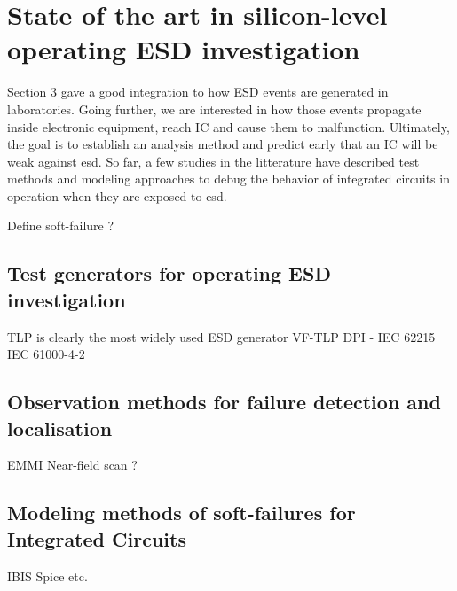 \section{State of the art in silicon-level operating ESD investigation}

Section 3 gave a good integration to how ESD events are generated in laboratories.
Going further, we are interested in how those events propagate inside electronic equipment, reach \gls{IC} and cause them to malfunction.
Ultimately, the goal is to establish an analysis method and predict early that an \gls{IC} will be weak against \gls{esd}.
So far, a few studies in the litterature have described test methods and modeling approaches to debug the behavior of
integrated circuits in operation when they are exposed to \gls{esd}.

Define soft-failure ?


\subsection{Test generators for operating ESD investigation}

TLP is clearly the most widely used ESD generator
VF-TLP
DPI - IEC 62215
IEC 61000-4-2

\subsection{Observation methods for failure detection and localisation}

EMMI
Near-field scan ?

\subsection{Modeling methods of soft-failures for Integrated Circuits}

IBIS
Spice
etc.
